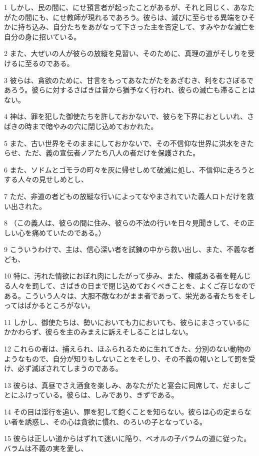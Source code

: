 \par 1 しかし、民の間に、にせ預言者が起ったことがあるが、それと同じく、あなたがたの間にも、にせ教師が現れるであろう。彼らは、滅びに至らせる異端をひそかに持ち込み、自分たちをあがなって下さった主を否定して、すみやかな滅亡を自分の身に招いている。
\par 2 また、大ぜいの人が彼らの放縦を見習い、そのために、真理の道がそしりを受けるに至るのである。
\par 3 彼らは、貪欲のために、甘言をもってあなたがたをあざむき、利をむさぼるであろう。彼らに対するさばきは昔から猶予なく行われ、彼らの滅亡も滞ることはない。
\par 4 神は、罪を犯した御使たちを許しておかないで、彼らを下界におとしいれ、さばきの時まで暗やみの穴に閉じ込めておかれた。
\par 5 また、古い世界をそのままにしておかないで、その不信仰な世界に洪水をきたらせ、ただ、義の宣伝者ノアたち八人の者だけを保護された。
\par 6 また、ソドムとゴモラの町々を灰に帰せしめて破滅に処し、不信仰に走ろうとする人々の見せしめとし、
\par 7 ただ、非道の者どもの放縦な行いによってなやまされていた義人ロトだけを救い出された。
\par 8 （この義人は、彼らの間に住み、彼らの不法の行いを日々見聞きして、その正しい心を痛めていたのである。）
\par 9 こういうわけで、主は、信心深い者を試錬の中から救い出し、また、不義な者ども、
\par 10 特に、汚れた情欲におぼれ肉にしたがって歩み、また、権威ある者を軽んじる人々を罰して、さばきの日まで閉じ込めておくべきことを、よくご存じなのである。こういう人々は、大胆不敵なわがまま者であって、栄光ある者たちをそしってはばかるところがない。
\par 11 しかし、御使たちは、勢いにおいても力においても、彼らにまさっているにかかわらず、彼らを主のみまえに訴えそしることはしない。
\par 12 これらの者は、捕えられ、ほふられるために生れてきた、分別のない動物のようなもので、自分が知りもしないことをそしり、その不義の報いとして罰を受け、必ず滅ぼされてしまうのである。
\par 13 彼らは、真昼でさえ酒食を楽しみ、あなたがたと宴会に同席して、だましごとにふけっている。彼らは、しみであり、きずである。
\par 14 その目は淫行を追い、罪を犯して飽くことを知らない。彼らは心の定まらない者を誘惑し、その心は貪欲に慣れ、のろいの子となっている。
\par 15 彼らは正しい道からはずれて迷いに陥り、ベオルの子バラムの道に従った。バラムは不義の実を愛し、
